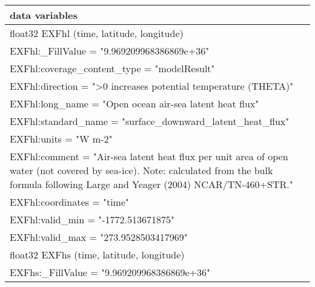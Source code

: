 \begin{longtable}{|p{\textwidth}|}
data variables\\
\hline
\hspace{0.5cm}float32 EXFhl (time, latitude, longitude)\\
\hspace{0.5cm}\hspace{0.5cm}EXFhl:\_FillValue = "9.969209968386869e+36"\\
\hspace{0.5cm}\hspace{0.5cm}EXFhl:coverage\_content\_type = "modelResult"\\
\hspace{0.5cm}\hspace{0.5cm}EXFhl:direction = ">0 increases potential temperature (THETA)"\\
\hspace{0.5cm}\hspace{0.5cm}EXFhl:long\_name = "Open ocean air-sea latent heat flux"\\
\hspace{0.5cm}\hspace{0.5cm}EXFhl:standard\_name = "surface\_downward\_latent\_heat\_flux"\\
\hspace{0.5cm}\hspace{0.5cm}EXFhl:units = "W m-2"\\
\hspace{0.5cm}\hspace{0.5cm}EXFhl:comment = "Air-sea latent heat flux per unit area of open water (not covered by sea-ice). Note: calculated from the bulk formula following Large and Yeager (2004) NCAR/TN-460+STR."\\
\hspace{0.5cm}\hspace{0.5cm}EXFhl:coordinates = "time"\\
\hspace{0.5cm}\hspace{0.5cm}EXFhl:valid\_min = "-1772.513671875"\\
\hspace{0.5cm}\hspace{0.5cm}EXFhl:valid\_max = "273.9528503417969"\\
\hspace{0.5cm}float32 EXFhs (time, latitude, longitude)\\
\hspace{0.5cm}\hspace{0.5cm}EXFhs:\_FillValue = "9.969209968386869e+36"\\

\end{longtable}

